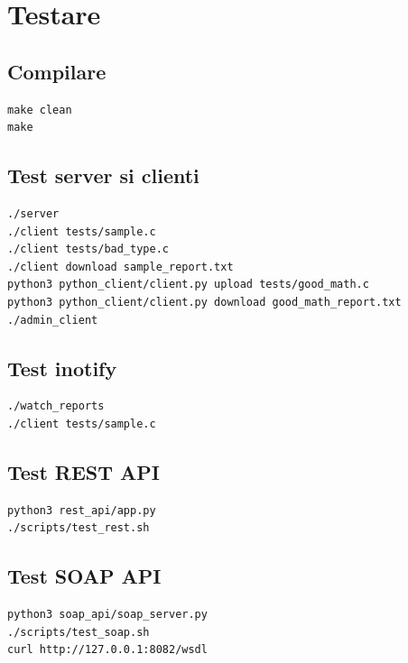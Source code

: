\documentclass[12pt,a4paper]{article}
\begin{document}
\section{Testare}

\subsection{Compilare}

\begin{lstlisting}[style=code]
make clean
make
\end{lstlisting}

\subsection{Test server si clienti}

\begin{lstlisting}[style=code]
./server
./client tests/sample.c
./client tests/bad_type.c
./client download sample_report.txt
python3 python_client/client.py upload tests/good_math.c
python3 python_client/client.py download good_math_report.txt
./admin_client
\end{lstlisting}

\subsection{Test inotify}

\begin{lstlisting}[style=code]
./watch_reports
./client tests/sample.c
\end{lstlisting}

\subsection{Test REST API}

\begin{lstlisting}[style=code]
python3 rest_api/app.py
./scripts/test_rest.sh
\end{lstlisting}

\subsection{Test SOAP API}

\begin{lstlisting}[style=code]
python3 soap_api/soap_server.py
./scripts/test_soap.sh
curl http://127.0.0.1:8082/wsdl
\end{lstlisting}
\end{document}
